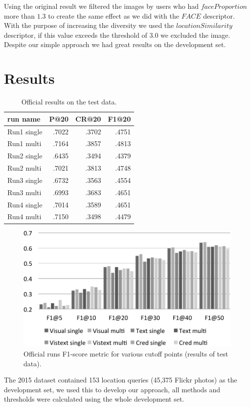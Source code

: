 \documentclass{acm_proc_article-me}
\begin{document}
Using the original result we filtered the images by users who had $faceProportion$ more than $1.3$ to create the same effect as we did with the $FACE$ descriptor. With the purpose of increasing the diversity we used the $locationSimilarity$ descriptor, if this value exceeds the threshold of $3.0$ we excluded the image. Despite our simple approach we had great results on the development set.

\section{Results}

\begin{table}[t]
	\centering
\begin{tabular}{|l|r|r|r|}
	\hline 
	run name & P@20 & CR@20 & F1@20\tabularnewline
	\hline 
	\hline 
	Run1 single & .7022 & .3702 & .4751\tabularnewline
	\hline 
	Run1 multi & .7164 & .3857 & .4813\tabularnewline
	\hline 
	Run2 single & .6435 & .3494 & .4379\tabularnewline
	\hline 
	Run2 multi & .7021 & .3813 & .4748\tabularnewline
	\hline 
	Run3 single & .6732 & .3563 & .4554\tabularnewline
	\hline 
	Run3 multi & .6993 & .3683 & .4651\tabularnewline
	\hline 
	Run4 single & .7014 & .3589 & .4651\tabularnewline
	\hline 
	Run4 multi & .7150 & .3498 & .4479\tabularnewline
	\hline
\end{tabular}
\label{table:results}
\caption{Official results on the test data.}
\end{table}

\begin{figure}[t]
\includegraphics[width=1.0\linewidth]{f1}
\caption{Official runs F1-score metric for various cutoff points (results of test data).}
\label{fig:f1}
\end{figure}
The 2015 dataset contained 153 location queries (45,375 Flickr photos) as the development set, we used this to develop our approach, all methods and thresholds were calculated using the whole development set.
\end{document}
